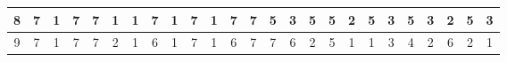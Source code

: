 \begin{sidewaystable}[]
\begin{tabular}{|c|c|c|c|c|c|c|c|c|c|c|c|c|c|c|c|c|c|c|c|c|c|c|c|c|}
    8       & 7                                               & 1                                               & 7                                               & 7                                               & 1                                               & 1                                               & 7                                               & 1                                               & 7                                               & 1                                                & 7                                                & 7                                                & 5                                               & 3                                               & 5                                               & 5                                               & 2                                               & 5                                               & 3                                               & 5                                               & 3                                               & 2                                                & 5                                                & 3                                                \\ \hline
    9       & 7                                               & 1                                               & 7                                               & 7                                               & 2                                               & 1                                               & 6                                               & 1                                               & 7                                               & 1                                                & 6                                                & 7                                                & 7                                               & 6                                               & 2                                               & 5                                               & 1                                               & 1                                               & 3                                               & 4                                               & 2                                               & 6                                                & 2                                                & 1                                                \\ \hline

\end{tabular}
\end{sidewaystable}
